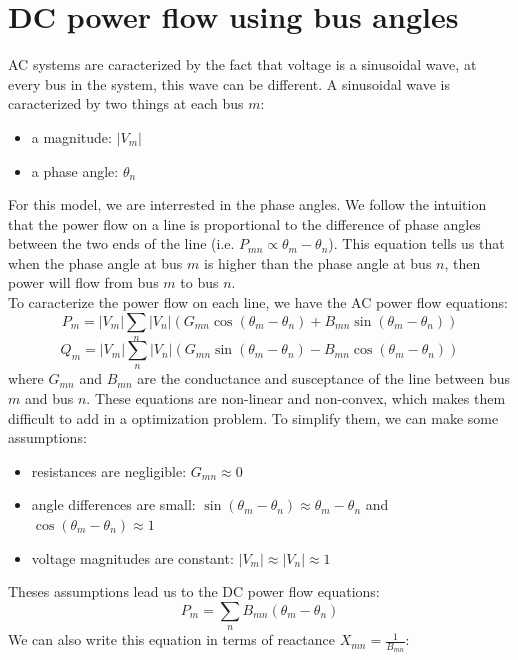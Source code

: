 \documentclass[12pt, openany]{report}
\theoremstyle{definition}
\begin{document}
\section{DC power flow using bus angles}
AC systems are caracterized by the fact that voltage is a sinusoidal wave, at every bus in the system, this wave can be different. A sinusoidal wave is caracterized by two things at each bus $m$:
\begin{itemize}
    \item a magnitude: $|V_m|$
    \item a phase angle: $\theta_n$
\end{itemize}
For this model, we are interrested in the phase angles. We follow the intuition that the power flow on a line is proportional to the difference of phase angles between the two ends of the line (i.e. $P_{mn} \propto \theta_m - \theta_n$). This equation tells us that when the phase angle at bus $m$ is higher than the phase angle at bus $n$, then power will flow from bus $m$ to bus $n$.\\ 
To caracterize the power flow on each line, we have the AC power flow equations:
\begin{equation}
    P_{m} = |V_m| \sum_n |V_n| (G_{mn} \cos(\theta_m - \theta_n) + B_{mn} \sin(\theta_m - \theta_n))
\end{equation}
\begin{equation}
    Q_{m} = |V_m| \sum_n |V_n| (G_{mn} \sin(\theta_m - \theta_n) - B_{mn} \cos(\theta_m - \theta_n))
\end{equation}
where $G_{mn}$ and $B_{mn}$ are the conductance and susceptance of the line between bus $m$ and bus $n$. These equations are non-linear and non-convex, which makes them difficult to add in a optimization problem. To simplify them, we can make some assumptions:
\begin{itemize}
    \item resistances are negligible: $G_{mn} \approx 0$
    \item angle differences are small: $\sin(\theta_m - \theta_n) \approx \theta_m - \theta_n$ and $\cos(\theta_m - \theta_n) \approx 1$
    \item voltage magnitudes are constant: $|V_m| \approx |V_n| \approx 1$
\end{itemize}
Theses assumptions lead us to the DC power flow equations:
\begin{equation}
    P_{m} = \sum_n B_{mn} (\theta_m - \theta_n)
\end{equation}
We can also write this equation in terms of reactance $X_{mn} = \frac{1}{B_{mn}}$:
\end{document}

